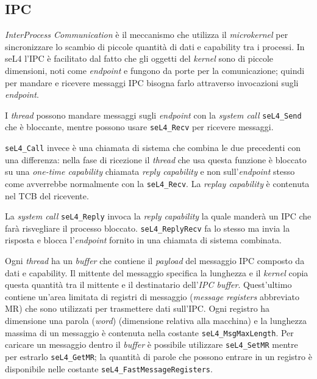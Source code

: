 \subsection{IPC}
\textit{InterProcess Communication} è il meccanismo che utilizza il \textit{microkernel} per sincronizzare lo scambio di  piccole quantità di dati e capability tra i processi. In seL4 l'IPC è facilitato dal fatto che gli oggetti del \textit{kernel} sono di piccole dimensioni, noti come \textit{endpoint} e fungono da porte per la comunicazione; quindi per mandare e ricevere messaggi IPC bisogna farlo attraverso invocazioni sugli \textit{endpoint}.

I \textit{thread} possono mandare messaggi sugli \textit{endpoint} con la \textit{system call} \texttt{seL4\_Send} che è bloccante, mentre possono usare \texttt{seL4\_Recv} per ricevere messaggi.

\texttt{seL4\_Call} invece è una chiamata di sistema che combina le due precedenti con una differenza: nella fase di ricezione il \textit{thread} che usa questa funzione è bloccato su una \textit{one-time capability} chiamata \textit{reply capability} e non sull'\textit{endpoint} stesso come avverrebbe normalmente con la \texttt{seL4\_Recv}. La \textit{replay capability} è contenuta nel TCB del ricevente.

La \textit{system call} \texttt{seL4\_Reply} invoca la \textit{reply capability} la quale manderà un IPC che farà risvegliare il processo bloccato. \texttt{seL4\_ReplyRecv} fa lo stesso ma invia la risposta e blocca l'\textit{endpoint} fornito in una chiamata di sistema combinata.

Ogni \textit{thread} ha un \textit{buffer} che contiene il \textit{payload} del messaggio IPC composto da dati e capability. Il mittente del messaggio specifica la lunghezza e il \textit{kernel} copia questa quantità tra il mittente e il destinatario dell'\textit{IPC buffer}. Quest'ultimo contiene un'area limitata di registri di messaggio (\textit{message registers} abbreviato MR) che sono utilizzati per trasmettere dati sull'IPC. Ogni registro ha dimensione una parola (\textit{word}) (dimensione relativa alla macchina) e la lunghezza massima di un messaggio è contenuta nella costante \texttt{seL4\_MsgMaxLength}. Per caricare un messaggio dentro il \textit{buffer} è possibile utilizzare \texttt{seL4\_SetMR} mentre per estrarlo \texttt{seL4\_GetMR}; la quantità di parole che possono entrare in un registro è disponibile nelle costante \texttt{seL4\_FastMessageRegisters}.

